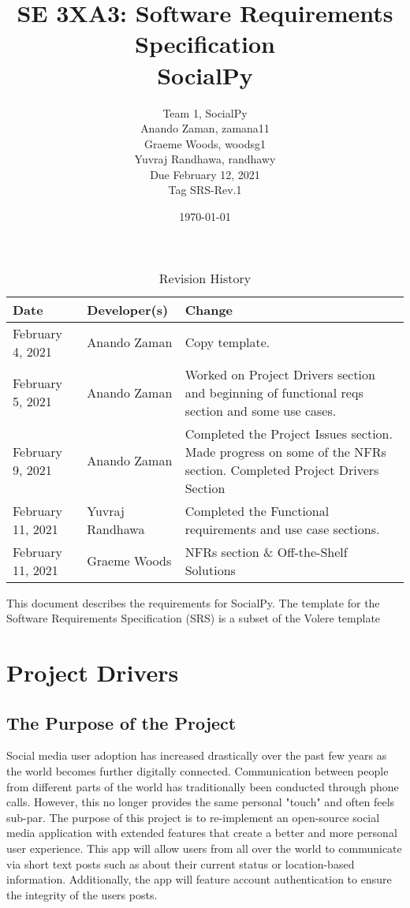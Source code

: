 \documentclass[12pt, titlepage]{article}
\title{SE 3XA3: Software Requirements Specification\\SocialPy}
\author{
	Team 1, SocialPy
		\\ Anando Zaman, zamana11
        \\ Graeme Woods, woodsg1
        \\ Yuvraj Randhawa, randhawy
        \\ Due February 12, 2021
        \\ Tag SRS-Rev.1
}
\date{\today}
\begin{document}
\maketitle

\tableofcontents
\listoftables
\listoffigures


\begin{table}[!hbp]
    \caption{Revision History} \label{TblRevisionHistory}
    \begin{tabularx}{\textwidth}{llX}
        \toprule
            \textbf{Date} & \textbf{Developer(s)} & \textbf{Change}\\
        \midrule
            February 4, 2021 & Anando Zaman & Copy template.\\
            February 5, 2021 & Anando Zaman & Worked on Project Drivers section and beginning of functional reqs section and some use cases.\\
            February 9, 2021 & Anando Zaman & Completed the Project Issues section. Made progress on some of the NFRs section. Completed Project Drivers Section\\
            February 11, 2021 & Yuvraj Randhawa & Completed the Functional requirements and use case sections.\\
            February 11, 2021 & Graeme Woods & NFRs section \& Off-the-Shelf Solutions\\
        \bottomrule
    \end{tabularx}
\end{table}

\newpage


This document describes the requirements for SocialPy.  The template for the Software Requirements Specification (SRS) is a subset of the Volere template 

\section{Project Drivers}

\subsection{The Purpose of the Project}
Social media user adoption has increased drastically over the past few years as the world becomes further digitally connected. Communication between people from different parts of the world has traditionally been conducted through phone calls. However, this no longer provides the same personal "touch" and often feels sub-par. The purpose of this project is to re-implement an open-source social media application with extended features that create a better and more personal user experience. This app will allow users from all over the world to communicate via short text posts such as about their current status or location-based information. Additionally, the app will feature account authentication to ensure the integrity of the users posts. 
\end{document}
